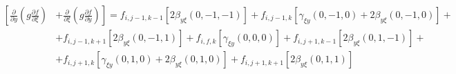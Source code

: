 \begin{equation*}
    \begin{split}
        \left[
            \frac
                {\partial}
                {\partial y}
            \left(
                g
                \frac
                    {\partial f}
                    {\partial \xi}
            \right)
        \right.&
        \left.
            +
            \frac
                {\partial}
                {\partial \xi}
            \left(
                g
                \frac
                    {\partial f}
                    {\partial y}
            \right)
        \right]
        =
        f_{i, j-1, k-1}
        \left[
            2
            \beta_{y\xi} \left(0, -1, -1\right)
        \right]
        +
        f_{i, j-1, k}
        \left[
            \gamma_{\xi y} \left(0, -1, 0\right)
            +
            2
            \beta_{y \xi} \left(0, -1, 0\right)
        \right]
        +
        \\
        &
        +
        f_{i, j-1, k+1}
        \left[
            2
            \beta_{y\xi} \left(0, -1, 1\right)
        \right]
        +
        f_{i, f, k}
        \left[
            \gamma_{\xi y} \left(0, 0, 0\right)
        \right]
        +
        f_{i, j+1, k-1}
        \left[
            2
            \beta_{y\xi} \left(0, 1, -1\right)
        \right]
        +
        \\
        &
        +
        f_{i, j+1, k}
        \left[
            \gamma_{\xi y} \left(0, 1, 0\right)
            +
            2
            \beta_{y \xi} \left(0, 1, 0\right)
        \right]
        +
        f_{i, j+1, k+1}
        \left[
            2
            \beta_{y\xi} \left(0, 1, 1\right)
        \right]
    \end{split}
\end{equation*}